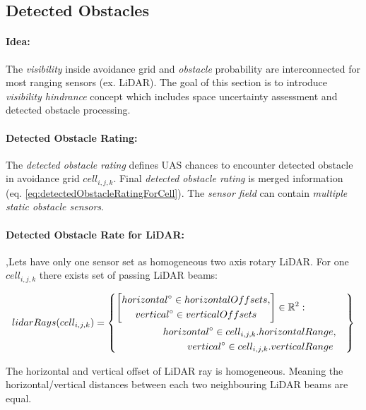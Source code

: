 \subsection{Detected Obstacles}\label{s:detectedObstacles}
\paragraph{Idea:} The \emph{visibility} inside avoidance grid and \emph{obstacle} probability are interconnected for most ranging sensors (ex. LiDAR). The goal of this section is to introduce \emph{visibility hindrance} concept which includes space uncertainty assessment and detected obstacle  processing.

\paragraph{Detected Obstacle Rating:} The \emph{detected obstacle rating} defines UAS chances to encounter detected obstacle in avoidance grid $cell_{i,j,k}$. Final \emph{detected obstacle rating} is merged information (eq. \ref{eq:detectedObstacleRatingForCell}). The \emph{sensor field} can contain \emph{multiple} \emph{static obstacle sensors}.

\paragraph{Detected Obstacle Rate for LiDAR:},Lets have only one sensor set as homogeneous two axis rotary LiDAR. For one $cell_{i,j,k}$ there exists set of passing LiDAR beams:

\begin{equation}\label{eq:lidarRaysTroughCell}
    lidar Rays(cell_{i,j,k})=
    \left\{
        \begin{aligned}
        \left[
            \begin{gathered}
                horizontal^\circ\in horizontal Offsets,\\
                vertical^\circ\in vertical Offsets
            \end{gathered}
        \right]\in\mathbb{R}^2:&\\
        horizontal^\circ\in cell_{i,j,k}.horizontal &Range,\\
        vertical^\circ\in cell_{i,j,k}.vertical &Range\\
        \end{aligned}
    \right\}
\end{equation}

\newpage\noindent The horizontal and vertical offset of LiDAR ray is homogeneous. Meaning the horizontal/vertical distances between each two neighbouring LiDAR beams are equal.

